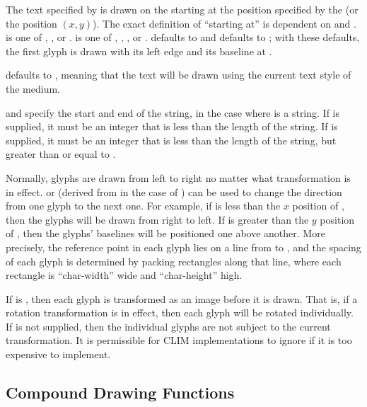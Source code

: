 The text specified by  is drawn on the 
 starting at the position specified by the  
(or the position $(x,y)$).  The exact definition of ``starting at'' is dependent
on  and .   is one of ,
, or .   is one of ,
, , or .   defaults to 
and  defaults to ; with these defaults, the first
glyph is drawn with its left edge and its baseline at .

 defaults to , meaning that the text will be drawn using
the current text style of the medium.

 and  specify the start and end of the string, in the case
where  is a string.  If  is supplied, it must be
an integer that is less than the length of the string.  If  is
supplied, it must be an integer that is less than the length of the string, but
greater than or equal to .

Normally, glyphs are drawn from left to right no matter what transformation is
in effect.   or  (derived from  in
the case of ) can be used to change the direction from one glyph
to the next one.  For example, if  is less than the $x$ position
of , then the glyphs will be drawn from right to left.  If
 is greater than the $y$ position of , then the glyphs'
baselines will be positioned one above another.  More precisely, the reference
point in each glyph lies on a line from  to , and
the spacing of each glyph is determined by packing rectangles along that line,
where each rectangle is ``char-width'' wide and ``char-height'' high.

If  is , then each glyph is transformed as an
image before it is drawn.  That is, if a rotation transformation is in effect,
then each glyph will be rotated individually.  If  is not
supplied, then the individual glyphs are not subject to the current
transformation.  It is permissible for CLIM implementations to ignore
 if it is too expensive to implement.


\subsection {Compound Drawing Functions}

